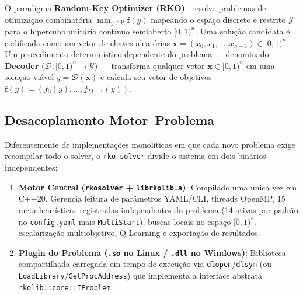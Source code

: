 \documentclass[11pt,a4paper]{article}
\begin{document}
O paradigma \textbf{Random-Key Optimizer (RKO)}~\cite{chaves2025rko,bean1994rkga} resolve problemas de otimização combinatória $\min_{y \in \mathcal{Y}} \mathbf{f}(y)$ mapeando o espaço discreto e restrito $\mathcal{Y}$ para o hipercubo unitário contínuo semiaberto $[0,1)^n$. Uma solução candidata é codificada como um vetor de chaves aleatórias $\mathbf{x} = (x_0, x_1, \dots, x_{n-1}) \in [0,1)^n$. Um procedimento determinístico dependente do problema --- denominado \textbf{Decoder} ($\mathcal{D}: [0,1)^n \to \mathcal{Y}$) --- transforma qualquer vetor $\mathbf{x} \in [0,1)^n$ em uma solução viável $y = \mathcal{D}(\mathbf{x})$ e calcula seu vetor de objetivos $\mathbf{f}(y) = (f_0(y), \dots, f_{M-1}(y))$.

\subsection{Desacoplamento Motor--Problema}

Diferentemente de implementações monolíticas em que cada novo problema exige recompilar todo o solver, o \texttt{rko-solver} divide o sistema em dois binários independentes:
\begin{enumerate}[leftmargin=*]
  \item \textbf{Motor Central (\texttt{rkosolver} + \texttt{librkolib.a})}: Compilado uma única vez em C++20. Gerencia leitura de parâmetros YAML/CLI, threads OpenMP, 15 meta-heurísticas registradas independentes do problema (14 ativas por padrão no \texttt{config.yaml} mais \texttt{MultiStart}), buscas locais no espaço $[0,1)^n$, escalarização multiobjetivo, Q-Learning e exportação de resultados.
  \item \textbf{Plugin do Problema (\texttt{.so} no Linux / \texttt{.dll} no Windows)}: Biblioteca compartilhada carregada em tempo de execução via \texttt{dlopen}/\texttt{dlsym} (ou \texttt{LoadLibrary}/\texttt{GetProcAddress}) que implementa a interface abstrata \texttt{rkolib::core::IProblem}.
\end{enumerate}
\end{document}
